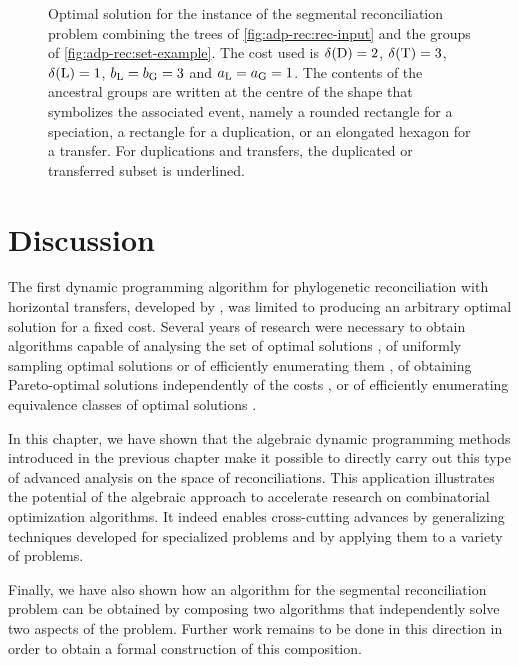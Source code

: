 \begin{figure}[h]
    \capstart
    \centering
    
    \caption[Parsimonious scenario for a segmental reconciliation instance]{
        Optimal solution for the instance of the segmental reconciliation problem combining the trees of \cref{fig:adp-rec:rec-input} and the groups of \cref{fig:adp-rec:set-example}.
        The cost used is \(\delta\kern.1pt(\mathrm{D}) = 2\), \(\delta\kern.1pt(\mathrm{T}) = 3\), \(\delta\kern.1pt(\mathrm{L}) = 1\), \(b_{\mathrm{L}} = b_{\mathrm{G}} = 3\) and \(a_{\mathrm{L}} = a_{\mathrm{G}} = 1\).
        The contents of the ancestral groups are written at the centre of the shape that symbolizes the associated event, namely a rounded rectangle for a speciation, a rectangle for a duplication, or an elongated hexagon for a transfer.
        For duplications and transfers, the duplicated or transferred subset is underlined.
        \label{fig:adp-rec:syn-solution-best}
    }
\end{figure}

\section{Discussion}

The first dynamic programming algorithm for phylogenetic reconciliation with horizontal transfers, developed by \textcite{Hallett2004SimultaneousIdentificationDuplications}, was limited to producing an arbitrary optimal solution for a fixed cost.
Several years of research were necessary to obtain algorithms capable
of analysing the set of optimal solutions \parencite{Scornavacca2013RepresentingSetReconciliations},
of uniformly sampling optimal solutions \parencite{Bansal2013ReconciliationRevisitedHandling}
or of efficiently enumerating them \parencite{Donati2015EfficientTreeReconciliation},
of obtaining Pareto-optimal solutions independently of the costs \parencite{LibeskindHadas2014ParetoOptimalPhylogenetic},
or of efficiently enumerating equivalence classes of optimal solutions \parencite{Wang2022EfficientlySparseListing}.

In this chapter, we have shown that the algebraic dynamic programming methods introduced in the previous chapter make it possible to directly carry out this type of advanced analysis on the space of reconciliations.
This application illustrates the potential of the algebraic approach to accelerate research on combinatorial optimization algorithms.
It indeed enables cross-cutting advances by generalizing techniques developed for specialized problems and by applying them to a variety of problems.

Finally, we have also shown how an algorithm for the segmental reconciliation problem can be obtained by composing two algorithms that independently solve two aspects of the problem.
Further work remains to be done in this direction in order to obtain a formal construction of this composition.
